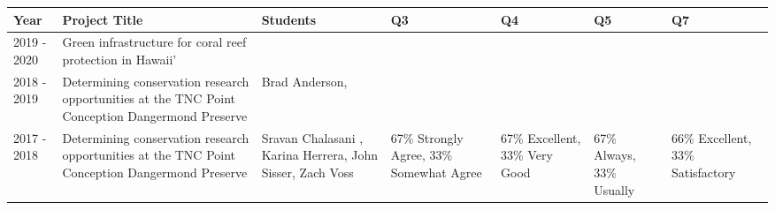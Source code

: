 
\begin{longtable}{p{1cm}p{2.5cm}p{3cm}p{2cm}p{2cm}p{2cm}p{2cm}}
Year & Project Title & Students & Q3 & Q4 & Q5 & Q7\\
\hline 
\endhead 
2019 - 2020 & Green infrastructure for coral reef protection in Hawaii' &  &  &  &  &  \\ 
2018 - 2019 & Determining conservation research opportunities at the TNC Point Conception Dangermond Preserve & Brad Anderson,  &  &  &  &  \\ 
2017 - 2018 & Determining conservation research opportunities at the TNC Point Conception Dangermond Preserve & Sravan Chalasani , Karina Herrera, John Sisser, Zach Voss & 67\% Strongly Agree, 33\% Somewhat Agree & 67\% Excellent, 33\% Very Good & 67\% Always, 33\% Usually & 66\% Excellent, 33\% Satisfactory \\ 
\end{longtable}

